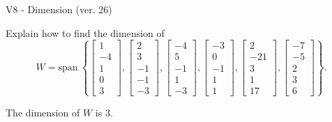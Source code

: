 \begin{exercise}
  \begin{exerciseTitle}V8 - Dimension (ver. 26)\end{exerciseTitle}
  \begin{exerciseStatement}
    Explain how to find the dimension of 
\[W=\mathrm{span}\ \left\{\left[\begin{array}{r}
1 \\
-4 \\
1 \\
0 \\
3
\end{array}\right] , \left[\begin{array}{r}
2 \\
3 \\
-1 \\
-1 \\
-3
\end{array}\right] , \left[\begin{array}{r}
-4 \\
5 \\
-1 \\
1 \\
-3
\end{array}\right] , \left[\begin{array}{r}
-3 \\
0 \\
-1 \\
1 \\
1
\end{array}\right] , \left[\begin{array}{r}
2 \\
-21 \\
3 \\
1 \\
17
\end{array}\right] , \left[\begin{array}{r}
-7 \\
-5 \\
2 \\
3 \\
6
\end{array}\right]\right\}.\]



  \end{exerciseStatement}
  \begin{exerciseAnswer}
   The dimension of \(W\) is  \(3\).
  


  \end{exerciseAnswer}
\end{exercise}